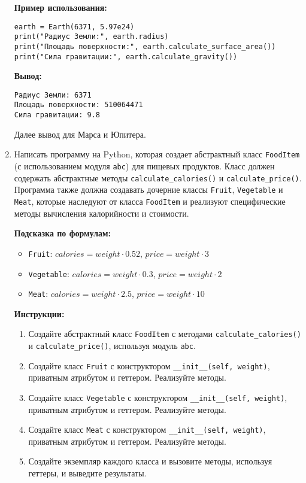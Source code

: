 \begin{enumerate}
\textbf{Пример использования:}
\begin{verbatim}
earth = Earth(6371, 5.97e24)
print("Радиус Земли:", earth.radius)
print("Площадь поверхности:", earth.calculate_surface_area())
print("Сила гравитации:", earth.calculate_gravity())
\end{verbatim}

\textbf{Вывод:}
\begin{verbatim}
Радиус Земли: 6371
Площадь поверхности: 510064471
Сила гравитации: 9.8
\end{verbatim}

Далее вывод для Марса и Юпитера.

\item
Написать программу на Python, которая создает абстрактный класс \texttt{FoodItem} (с использованием модуля \texttt{abc}) для пищевых продуктов. 
Класс должен содержать абстрактные методы \texttt{calculate\_calories()} и \texttt{calculate\_price()}. 
Программа также должна создавать дочерние классы \texttt{Fruit}, \texttt{Vegetable} и \texttt{Meat}, 
которые наследуют от класса \texttt{FoodItem} и реализуют специфические методы вычисления калорийности и стоимости.

\textbf{Подсказка по формулам:}
\begin{itemize}
    \item \texttt{Fruit}: $calories = weight \cdot 0.52$, $price = weight \cdot 3$
    \item \texttt{Vegetable}: $calories = weight \cdot 0.3$, $price = weight \cdot 2$
    \item \texttt{Meat}: $calories = weight \cdot 2.5$, $price = weight \cdot 10$
\end{itemize}

\textbf{Инструкции:}
\begin{enumerate}
    \item Создайте абстрактный класс \texttt{FoodItem} с методами \texttt{calculate\_calories()} и \texttt{calculate\_price()}, используя модуль \texttt{abc}.
    \item Создайте класс \texttt{Fruit} с конструктором \texttt{\_\_init\_\_(self, weight)}, приватным атрибутом и геттером. Реализуйте методы.
    \item Создайте класс \texttt{Vegetable} с конструктором \texttt{\_\_init\_\_(self, weight)}, приватным атрибутом и геттером. Реализуйте методы.
    \item Создайте класс \texttt{Meat} с конструктором \texttt{\_\_init\_\_(self, weight)}, приватным атрибутом и геттером. Реализуйте методы.
    \item Создайте экземпляр каждого класса и вызовите методы, используя геттеры, и выведите результаты.
\end{enumerate}


\end{enumerate}
